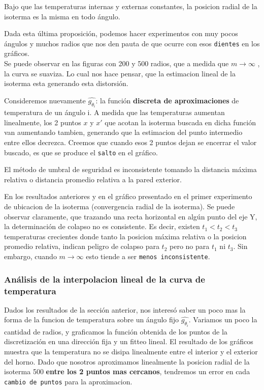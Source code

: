 \begin{proposition} 
	Bajo que las temperaturas internas y externas constantes, la posicion radial de la isoterma es la misma en todo ángulo.	
\end{proposition}

Dada esta última proposición, podemos hacer experimentos con muy pocos ángulos y muchos radios que nos den pauta de que ocurre con esos \texttt{dientes} en los gráficos. \\
Se puede observar en las figuras con 200 y 500 radios, que a medida que $m\to\infty$ , la curva se suaviza. Lo cual nos hace pensar, que la estimacion lineal de la isoterma esta generando esta distorsión.

\vspace{0.5cm}

Consideremos nuevamente $\hat{g_{\theta_i}}$: la función \textbf{discreta de aproximaciones} de temperatura de un ángulo i. A medida que las temperaturas aumentan linealmente, los 2 puntos $x$ y $x'$ que acotan la isoterma buscada en dicha función van aumentando tambien, generando que la estimacion del punto intermedio entre ellos decrezca. Creemos que cuando esos 2 puntos dejan se encerrar el valor buscado, es que se produce el \texttt{salto} en el gráfico.

\begin{proposition}
	El método de umbral de seguridad es inconsistente tomando la distancia máxima relativa o distancia promedio relativa a la pared exterior.
\end{proposition}

En los resultados anteriores y en el gráfico presentado en el primer experimento de ubicacion de la isoterma (convergencia radial de la isoterma). Se puede observar claramente, que trazando una recta horizontal en algún punto del eje Y, la determinación de colapso no es consistente. Es decir, existen $t_1 < t_2 < t_3$ temperaturas crecientes donde tanto la posicion máxima relativa o la posicion promedio relativa, indican peligro de colapso para $t_2$ pero no para $t_1$ ni $t_3$. Sin embargo, cuando $m\to\infty$ esto tiende a ser \texttt{menos inconsistente}.

\subsubsection{Análisis de la interpolacion lineal de la curva de temperatura}

Dados los resultados de la sección anterior, nos interesó saber un poco mas la forma de la funcion de temperatura sobre un ángulo fijo $\hat{g_{\theta_i}}$. 
Variamos un poco la cantidad de radios, y graficamos la función obtenida de los puntos de la discretización en una dirección fija y un fitteo lineal.
El resultado de los gráficos muestra que la temperatura no se disipa linealmente entre el interior y el exterior del horno. Dado que nosotros aproximamos linealmente la posicion radial de la isoterma 500 \textbf{entre los 2 puntos mas cercanos}, tendremos un error en cada \texttt{cambio de puntos} para la aproximacion.\\

